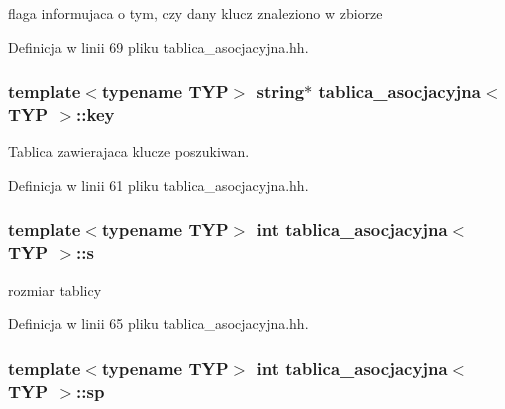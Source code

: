 flaga informujaca o tym, czy dany klucz znaleziono w zbiorze 



\-Definicja w linii 69 pliku tablica\-\_\-asocjacyjna.\-hh.

\hypertarget{classtablica__asocjacyjna_aefde9ad3347d42f36cab258144bacc1f}{
\subsubsection[{key}]{\setlength{\rightskip}{0pt plus 5cm}template$<$typename \-T\-Y\-P$>$ string$\ast$ {\bf tablica\-\_\-asocjacyjna}$<$ \-T\-Y\-P $>$\-::{\bf key}}}\label{classtablica__asocjacyjna_aefde9ad3347d42f36cab258144bacc1f}


\-Tablica zawierajaca klucze poszukiwan. 



\-Definicja w linii 61 pliku tablica\-\_\-asocjacyjna.\-hh.

\hypertarget{classtablica__asocjacyjna_a4a9d8aa0a03fd1ccf2fa7980d61bc197}{
\subsubsection[{s}]{\setlength{\rightskip}{0pt plus 5cm}template$<$typename \-T\-Y\-P$>$ int {\bf tablica\-\_\-asocjacyjna}$<$ \-T\-Y\-P $>$\-::{\bf s}}}\label{classtablica__asocjacyjna_a4a9d8aa0a03fd1ccf2fa7980d61bc197}


rozmiar tablicy 



\-Definicja w linii 65 pliku tablica\-\_\-asocjacyjna.\-hh.

\hypertarget{classtablica__asocjacyjna_a2af0a8be0f335f5ad09f908cb08c0039}{
\subsubsection[{sp}]{\setlength{\rightskip}{0pt plus 5cm}template$<$typename \-T\-Y\-P$>$ int {\bf tablica\-\_\-asocjacyjna}$<$ \-T\-Y\-P $>$\-::{\bf sp}}}\label{classtablica__asocjacyjna_a2af0a8be0f335f5ad09f908cb08c0039}


